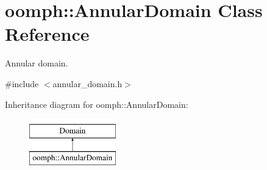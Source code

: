 \hypertarget{classoomph_1_1AnnularDomain}{}\section{oomph\+:\+:Annular\+Domain Class Reference}
\label{classoomph_1_1AnnularDomain}


Annular domain.  




{\ttfamily \#include $<$annular\+\_\+domain.\+h$>$}

Inheritance diagram for oomph\+:\+:Annular\+Domain\+:\begin{figure}[H]
\begin{center}
\leavevmode
\includegraphics[height=2.000000cm]{classoomph_1_1AnnularDomain}
\end{center}
\end{figure}
